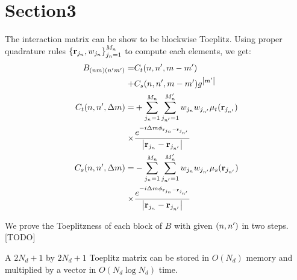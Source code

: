 \documentclass[main]{subfiles}
\begin{document}
\section{Section3}
\label{sec:Section3}
The interaction matrix can be show to be blockwise Toeplitz.
Using proper quadrature rules $\left\{\mathbf{r}_{j_n},w_{j_n}\right\}_{j_n=1}^{M_n}$ 
to compute each elements, we get:
\begin{align*}
B_{(nm)(n^{\prime} m^{\prime})} =& C_t(n,n^{\prime},m-m^{\prime}) \\
		    +&C_s(n,n^{\prime},m-m^{\prime})g^{\left| m^{\prime} \right|} \\
C_t(n,n^{\prime},\Delta m)=&+\sum\limits_{j_n=1}^{M_n}
\sum\limits_{j_{n^{\prime}}=1}^{M_n^{\prime}} w_{j_n}w_{j_{n^{\prime}}}\mu_t(\mathbf{r}_{j_{n^{\prime}}}) \\
\times& \frac{e^{-i \Delta m \phi_{\mathbf{r}_{j_n}-\mathbf{r}_{j_{n^{\prime}}}}}} 
{\left| \mathbf{r}_{j_n}-\mathbf{r}_{j_{n^{\prime}}} \right|} \\
C_s(n,n^{\prime},\Delta m)=&-\sum\limits_{j_n=1}^{M_n}
\sum\limits_{j_{n^{\prime}}=1}^{M_n^{\prime}} w_{j_n}w_{j_{n^{\prime}}}\mu_s(\mathbf{r}_{j_{n^{\prime}}}) \\
\times& \frac{e^{-i \Delta m \phi_{\mathbf{r}_{j_n}-\mathbf{r}_{j_{n^{\prime}}}}}} 
{\left| \mathbf{r}_{j_n}-\mathbf{r}_{j_{n^{\prime}}} \right|} \\
\end{align*}

We prove the Toeplitzness of each block of $B$ with given $(n,n^{\prime})$ in two
steps. [TODO]

A $2N_d+1$ by $2N_d+1$ Toeplitz matrix can be stored in $O(N_d)$ memory and
multiplied by a vector in $O(N_d \log{N_d})$ time.
\end{document}
